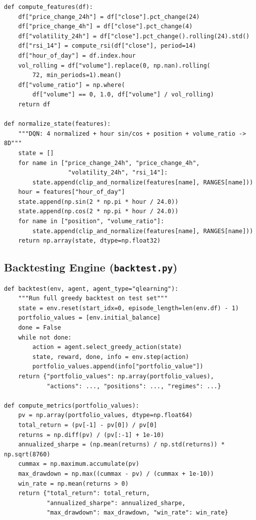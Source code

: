 \documentclass[11pt,a4paper]{article}
\begin{document}
\begin{lstlisting}
def compute_features(df):
    df["price_change_24h"] = df["close"].pct_change(24)
    df["price_change_4h"] = df["close"].pct_change(4)
    df["volatility_24h"] = df["close"].pct_change().rolling(24).std()
    df["rsi_14"] = compute_rsi(df["close"], period=14)
    df["hour_of_day"] = df.index.hour
    vol_rolling = df["volume"].replace(0, np.nan).rolling(
        72, min_periods=1).mean()
    df["volume_ratio"] = np.where(
        df["volume"] == 0, 1.0, df["volume"] / vol_rolling)
    return df

def normalize_state(features):
    """DQN: 4 normalized + hour sin/cos + position + volume_ratio -> 8D"""
    state = []
    for name in ["price_change_24h", "price_change_4h",
                  "volatility_24h", "rsi_14"]:
        state.append(clip_and_normalize(features[name], RANGES[name]))
    hour = features["hour_of_day"]
    state.append(np.sin(2 * np.pi * hour / 24.0))
    state.append(np.cos(2 * np.pi * hour / 24.0))
    for name in ["position", "volume_ratio"]:
        state.append(clip_and_normalize(features[name], RANGES[name]))
    return np.array(state, dtype=np.float32)
\end{lstlisting}

\subsection{Backtesting Engine (\texttt{backtest.py})}

\begin{lstlisting}
def backtest(env, agent, agent_type="qlearning"):
    """Run full greedy backtest on test set"""
    state = env.reset(start_idx=0, episode_length=len(env.df) - 1)
    portfolio_values = [env.initial_balance]
    done = False
    while not done:
        action = agent.select_greedy_action(state)
        state, reward, done, info = env.step(action)
        portfolio_values.append(info["portfolio_value"])
    return {"portfolio_values": np.array(portfolio_values),
            "actions": ..., "positions": ..., "regimes": ...}

def compute_metrics(portfolio_values):
    pv = np.array(portfolio_values, dtype=np.float64)
    total_return = (pv[-1] - pv[0]) / pv[0]
    returns = np.diff(pv) / (pv[:-1] + 1e-10)
    annualized_sharpe = (np.mean(returns) / np.std(returns)) * np.sqrt(8760)
    cummax = np.maximum.accumulate(pv)
    max_drawdown = np.max((cummax - pv) / (cummax + 1e-10))
    win_rate = np.mean(returns > 0)
    return {"total_return": total_return,
            "annualized_sharpe": annualized_sharpe,
            "max_drawdown": max_drawdown, "win_rate": win_rate}
\end{lstlisting}
\end{document}
